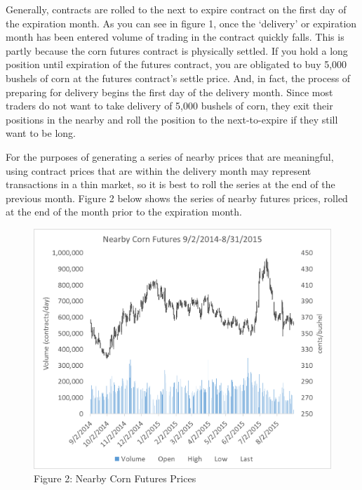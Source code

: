 \documentclass[
  letterpaper,
  DIV=11,
  numbers=noendperiod]{scrreprt}
\begin{document}
Generally, contracts are rolled to the next to expire contract on the
first day of the expiration month. As you can see in figure 1, once the
`delivery' or expiration month has been entered volume of trading in the
contract quickly falls. This is partly because the corn futures contract
is physically settled. If you hold a long position until expiration of
the futures contract, you are obligated to buy 5,000 bushels of corn at
the futures contract's settle price. And, in fact, the process of
preparing for delivery begins the first day of the delivery month. Since
most traders do not want to take delivery of 5,000 bushels of corn, they
exit their positions in the nearby and roll the position to the
next-to-expire if they still want to be long.

For the purposes of generating a series of nearby prices that are
meaningful, using contract prices that are within the delivery month may
represent transactions in a thin market, so it is best to roll the
series at the end of the previous month. Figure 2 below shows the series
of nearby futures prices, rolled at the end of the month prior to the
expiration month.

\begin{figure}

{\centering \includegraphics{Excel-files/IntroductiontoCommodityTS-Nearby_construct_files/image001.png}

}

\caption{Figure 2: Nearby Corn Futures Prices}

\end{figure}
\end{document}
